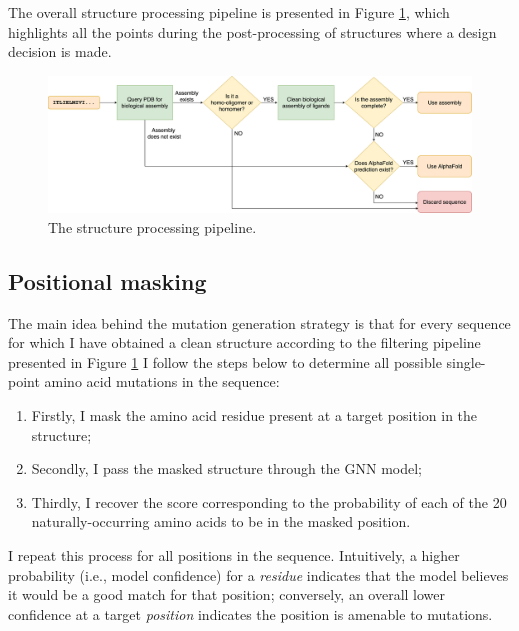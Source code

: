 The overall structure processing pipeline is presented in Figure \ref{filtering-steps}, which highlights all the points during the post-processing of structures where a design decision is made. 
\begin{figure}[!h]
    \centering
    \includegraphics[width=\textwidth]{masters-report/figures/data-process.png}
    \caption{The structure processing pipeline.}
    \label{filtering-steps}
\end{figure}

\subsection{Positional masking}
\label{positional-masking}
The main idea behind the mutation generation strategy is that for every sequence for which I have obtained a clean structure according to the filtering pipeline presented in Figure \ref{filtering-steps} I follow the steps below to determine all possible single-point amino acid mutations in the sequence:
\begin{enumerate}
    \item Firstly, I mask the amino acid residue present at a target position in the structure; 
    \item Secondly, I pass the masked structure through the GNN model; 
    \item Thirdly, I recover the score corresponding to the probability of each of the 20 naturally-occurring amino acids to be in the masked position. 
\end{enumerate}
I repeat this process for all positions in the sequence. 
Intuitively, a higher probability (i.e., model confidence) for a \textit{residue} indicates that the model believes it would be a good match for that position; conversely, an overall lower confidence at a target \textit{position} indicates the position is amenable to mutations.

